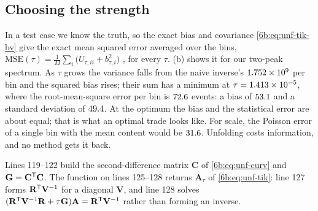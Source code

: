 \subsection{Choosing the strength}
\label{6b:sec:unf-choose}

In a test case we know the truth, so the exact bias and covariance \eqref{6b:eq:unf-tik-bv} give
the exact mean squared error averaged over the bins,
$\text{MSE}(\tau)=\frac1M\sum_i\bigl(U_{\tau,ii}+b_{\tau,i}^2\bigr)$ , for every
$\tau$. (b) shows it for our two-peak spectrum. As $\tau$ grows the
variance falls from the naive inverse's $1.752\times10^{9}$ per bin and the squared bias rises;
their sum has a minimum at $\tau=1.413\times10^{-5}$, where the root-mean-square error per bin is
$72.6$ events: a bias of $53.1$ and a standard deviation of
$49.4$. At the optimum the bias and the statistical error are about equal; that is
what an optimal trade looks like. For scale, the Poisson error of a single bin with the mean
content would be $31.6$. Unfolding costs information, and no method gets it back.


Lines 119--122 build the second-difference matrix $\mathbf C$ of \eqref{6b:eq:unf-curv} and
$\mathbf G=\mathbf C^{\mathsf{T}}\mathbf C$. The function on lines 125--128 returns $\mathbf A_\tau$ of
\eqref{6b:eq:unf-tik}: line 127 forms $\mathbf R^{\mathsf{T}}\mathbf V^{-1}$ for a diagonal $\mathbf V$, and line 128
solves $(\mathbf R^{\mathsf{T}}\mathbf V^{-1}\mathbf R+\tau\mathbf G)\mathbf A=\mathbf R^{\mathsf{T}}\mathbf V^{-1}$ rather than forming an inverse.

